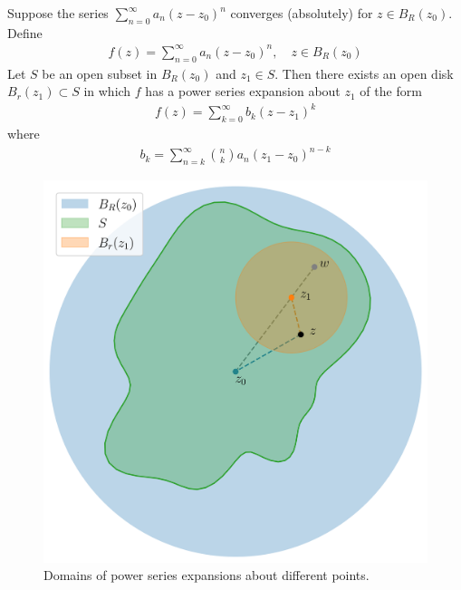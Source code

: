 \documentclass[thmcnt=section, 12pt]{my-elegantbook}
\begin{document}
\begin{theorem} \label{thm:63}
    Suppose the series $\sum_{n=0}^\infty a_n (z - z_0)^n$ converges (absolutely) for $z \in B_R(z_0)$. Define
    \begin{align*}
        f(z) = \sum_{n=0}^\infty a_n (z - z_0)^n,
        \quad z \in B_R(z_0)
    \end{align*}
    Let $S$ be an open subset in $B_R(z_0)$ and $z_1 \in S$. Then there exists an open disk $B_r(z_1) \subset S$ in which $f$ has a power series expansion about $z_1$ of the form
    \begin{align*}
        f(z) = \sum_{k=0}^\infty b_k (z - z_1)^k
    \end{align*}
    where
    \begin{align*}
        b_k = \sum_{n=k}^\infty \binom{n}{k} a_n (z_1 - z_0)^{n-k}
    \end{align*}
\end{theorem}

\begin{figure}[ht]
    \centering
    \includegraphics[scale=0.4]{figures/domain-001.png}
    \caption{Domains of power series expansions about different points.}
    \label{fig:13}
\end{figure}
\end{document}
